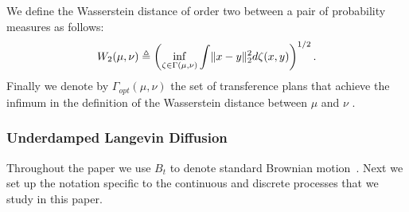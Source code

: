 We define the Wasserstein distance of order two between a pair of probability measures as follows:
\begin{align*}
W_2(\mu,\nu) \triangleq \left(\inf_{\zeta\in\Gamma(\mu,\nu)} \int \lVert x-y\rVert_2^2 d\zeta(x,y) \right)^{1/2}.
\end{align*}
Finally we denote by $\Gamma_{opt}(\mu,\nu)$ the set of transference plans that achieve the infimum in the definition of the Wasserstein distance between $\mu$ and $\nu$ \citep[for more properties of $W_2(\cdot,\cdot)$ see][]{villani}. 

\subsubsection{Underdamped Langevin Diffusion} \label{ss:underdampedlangevindiffusionnotation}
Throughout the paper we use $B_t$ to denote standard Brownian motion~\citep{brownian}. Next we set up the notation specific to the continuous and discrete processes that we study in this paper.
